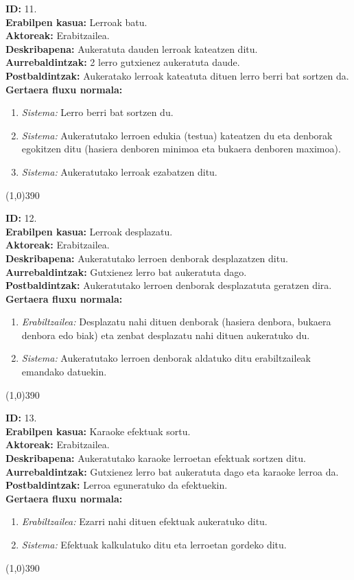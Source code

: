 \noindent
\textbf{ID:} 11.\\
\textbf{Erabilpen kasua:} Lerroak batu.\\
\textbf{Aktoreak:} Erabitzailea.\\
\textbf{Deskribapena:} Aukeratuta dauden lerroak kateatzen ditu.\\
\textbf{Aurrebaldintzak:} 2 lerro gutxienez aukeratuta daude.\\
\textbf{Postbaldintzak:} Aukeratako lerroak kateatuta dituen lerro berri bat sortzen da.\\
\textbf{Gertaera fluxu normala:}
\begin{enumerate}
	\item \textit{Sistema:} Lerro berri bat sortzen du.
	\item \textit{Sistema:} Aukeratutako lerroen edukia (testua) kateatzen du eta denborak egokitzen ditu (hasiera denboren minimoa eta bukaera denboren maximoa).
	\item \textit{Sistema:} Aukeratutako lerroak ezabatzen ditu.
\end{enumerate}
\line(1,0){390}

\noindent
\textbf{ID:} 12.\\
\textbf{Erabilpen kasua:} Lerroak desplazatu.\\
\textbf{Aktoreak:} Erabitzailea.\\
\textbf{Deskribapena:} Aukeratutako lerroen denborak desplazatzen ditu.\\
\textbf{Aurrebaldintzak:} Gutxienez lerro bat aukeratuta dago.\\
\textbf{Postbaldintzak:} Aukeratutako lerroen denborak desplazatuta geratzen dira.\\
\textbf{Gertaera fluxu normala:}
\begin{enumerate}
	\item \textit{Erabiltzailea:} Desplazatu nahi dituen denborak (hasiera denbora, bukaera denbora edo biak) eta zenbat desplazatu nahi dituen aukeratuko du.
	\item \textit{Sistema:} Aukeratutako lerroen denborak aldatuko ditu erabiltzaileak emandako datuekin.
\end{enumerate}
\line(1,0){390}

\noindent
\textbf{ID:} 13.\\
\textbf{Erabilpen kasua:} Karaoke efektuak sortu.\\
\textbf{Aktoreak:} Erabitzailea.\\
\textbf{Deskribapena:} Aukeratutako karaoke lerroetan efektuak sortzen ditu.\\
\textbf{Aurrebaldintzak:} Gutxienez lerro bat aukeratuta dago eta karaoke lerroa da.\\
\textbf{Postbaldintzak:} Lerroa eguneratuko da efektuekin.\\
\textbf{Gertaera fluxu normala:}
\begin{enumerate}
	\item \textit{Erabiltzailea:} Ezarri nahi dituen efektuak aukeratuko ditu.
	\item \textit{Sistema:} Efektuak kalkulatuko ditu eta lerroetan gordeko ditu.
\end{enumerate}
\line(1,0){390}

